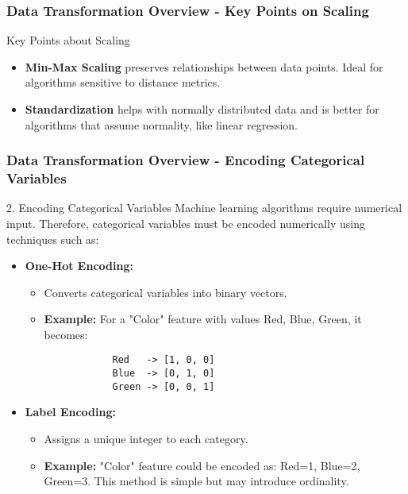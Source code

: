 \documentclass[aspectratio=169]{beamer}
\begin{document}
\begin{frame}[fragile]
    \frametitle{Data Transformation Overview - Key Points on Scaling}
    \begin{block}{Key Points about Scaling}
        \begin{itemize}
            \item \textbf{Min-Max Scaling} preserves relationships between data points. Ideal for algorithms sensitive to distance metrics.
            \item \textbf{Standardization} helps with normally distributed data and is better for algorithms that assume normality, like linear regression.
        \end{itemize}
    \end{block}
\end{frame}

\begin{frame}[fragile]
    \frametitle{Data Transformation Overview - Encoding Categorical Variables}
    \begin{block}{2. Encoding Categorical Variables}
        Machine learning algorithms require numerical input. Therefore, categorical variables must be encoded numerically using techniques such as:
    \end{block}
    \begin{itemize}
        \item \textbf{One-Hot Encoding:}
        \begin{itemize}
            \item Converts categorical variables into binary vectors.
            \item \textbf{Example:} For a "Color" feature with values {Red, Blue, Green}, it becomes:
            \begin{lstlisting}
            Red   -> [1, 0, 0]
            Blue  -> [0, 1, 0]
            Green -> [0, 0, 1]
            \end{lstlisting}
        \end{itemize}
        
        \item \textbf{Label Encoding:}
        \begin{itemize}
            \item Assigns a unique integer to each category.
            \item \textbf{Example:} "Color" feature could be encoded as: Red=1, Blue=2, Green=3. This method is simple but may introduce ordinality.
        \end{itemize}
    \end{itemize}
\end{frame}
\end{document}
